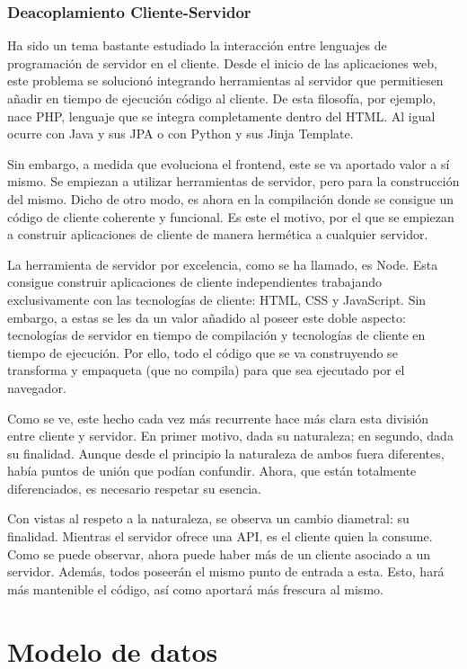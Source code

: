 \subsubsection{Deacoplamiento Cliente-Servidor}
Ha sido un tema bastante estudiado la interacción entre lenguajes de programación de servidor en el cliente. Desde el inicio de las aplicaciones web, este problema se solucionó integrando herramientas al servidor que permitiesen añadir en tiempo de ejecución código al cliente. De esta filosofía, por ejemplo, nace PHP, lenguaje que se integra completamente dentro del HTML. Al igual ocurre con Java y sus JPA o con Python y sus Jinja Template.

Sin embargo, a medida que evoluciona el frontend, este se va aportado valor a sí mismo. Se empiezan a utilizar herramientas de servidor, pero para la construcción del mismo. Dicho de otro modo, es ahora en la compilación donde se consigue un código de cliente coherente y funcional. Es este el motivo, por el que se empiezan a construir aplicaciones de cliente de manera hermética a cualquier servidor.

La herramienta de servidor por excelencia, como se ha llamado, es Node. Esta consigue construir aplicaciones de cliente independientes trabajando exclusivamente con las tecnologías de cliente: HTML, CSS y JavaScript. Sin embargo, a estas se les da un valor añadido al poseer este doble aspecto: tecnologías de servidor en tiempo de compilación y tecnologías de cliente en tiempo de ejecución. Por ello, todo el código que se va construyendo se transforma y empaqueta (que no compila) para que sea ejecutado por el navegador.

Como se ve, este hecho cada vez más recurrente hace más clara esta división entre cliente y servidor. En primer motivo, dada su naturaleza; en segundo, dada su finalidad. Aunque desde el principio la naturaleza de ambos fuera diferentes, había puntos de unión que podían confundir. Ahora, que están totalmente diferenciados, es necesario respetar su esencia.

Con vistas al respeto a la naturaleza, se observa un cambio diametral: su finalidad. Mientras el servidor ofrece una API, es el cliente quien la consume. Como se puede observar, ahora puede haber más de un cliente asociado a un servidor. Además, todos poseerán el mismo punto de entrada a esta. Esto, hará más mantenible el código, así como aportará más frescura al mismo.

\section{Modelo de datos}\label{sec:modelo_datos}


